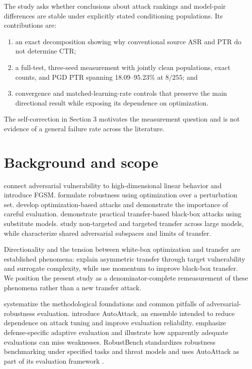 \documentclass[10pt]{article}
\begin{document}
The study asks whether conclusions about attack rankings and model-pair differences are stable under explicitly stated conditioning populations. Its contributions are:
\begin{enumerate}
\item an exact decomposition showing why conventional source ASR and PTR do not determine CTR;
\item a full-test, three-seed measurement with jointly clean populations, exact counts, and PGD PTR spanning 18.09--95.23\% at $8/255$; and
\item convergence and matched-learning-rate controls that preserve the main directional result while exposing its dependence on optimization.
\end{enumerate}
The self-correction in Section 3 motivates the measurement question and is not evidence of a general failure rate across the literature.

\section{Background and scope}
\citet{goodfellow} connect adversarial vulnerability to high-dimensional linear behavior and introduce FGSM. \citet{madry} formulate robustness using optimization over a perturbation set. \citet{carlini} develop optimization-based attacks and demonstrate the importance of careful evaluation. \citet{papernot} demonstrate practical transfer-based black-box attacks using substitute models. \citet{liu} study non-targeted and targeted transfer across large models, while \citet{tramerspace} characterize shared adversarial subspaces and limits of transfer.

Directionality and the tension between white-box optimization and transfer are established phenomena: \citet{demontis} explain asymmetric transfer through target vulnerability and surrogate complexity, while \citet{dong} use momentum to improve black-box transfer. We position the present study as a denominator-complete remeasurement of these phenomena rather than a new transfer attack.

\citet{carlini2019} systematize the methodological foundations and common pitfalls of adversarial-robustness evaluation. \citet{croce2020} introduce AutoAttack, an ensemble intended to reduce dependence on attack tuning and improve evaluation reliability. \citet{tramer2020} emphasize defense-specific adaptive evaluation and illustrate how apparently adequate evaluations can miss weaknesses. RobustBench standardizes robustness benchmarking under specified tasks and threat models and uses AutoAttack as part of its evaluation framework \citep{robustbench}.
\end{document}
